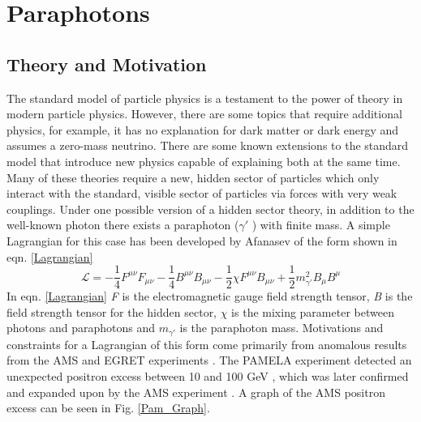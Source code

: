 \chapter{Paraphotons}
\label{chap:Paraphotons}

\section{Theory and Motivation}
	The standard model of particle physics is a testament to the power of theory in modern particle physics. However, there are some topics that require additional physics, for example, it has no explanation for dark matter or dark energy and assumes a zero-mass neutrino.  There are some known extensions to the standard model that introduce new physics capable of explaining both at the same time. Many of these theories require  a new, hidden sector of particles which only interact with the standard, visible sector of particles via forces with very weak couplings. Under one possible version of a hidden sector theory, in addition to the well-known photon there exists a paraphoton ($\gamma \prime$ ) with finite mass. A simple Lagrangian for this case has been developed by Afanasev \cite{Para_Afanasev} of the form shown in eqn. \ref{Lagrangian}
	\begin{equation}
	\mathcal{L} = -\frac{1}{4}F^{\mu\nu}F_{\mu\nu} - \frac{1}{4}B^{\mu\nu}B_{\mu\nu} -\frac{1}{2} \chi F^{\mu\nu}B_{\mu \nu} + \frac{1}{2} m_{\gamma'}^2 B_\mu B^\mu
	\label{Lagrangian}
	\end{equation}
	 In eqn. \ref{Lagrangian} \emph{F} is the electromagnetic gauge field strength tensor, \emph{B} is the field strength tensor for the hidden sector, $\chi$ is the mixing parameter between photons and paraphotons and $m_{\gamma'}$ is the paraphoton mass. Motivations and constraints  for a Lagrangian of this form come primarily from anomalous results from the AMS and EGRET experiments \cite{Para_Justification}. The PAMELA experiment detected an unexpected positron excess between 10 and 100 GeV \cite{PAMELA}, which was later confirmed and expanded upon by the AMS experiment \cite{AMS}.  A graph of the AMS positron excess can be seen in Fig. \ref{Pam_Graph}. 

